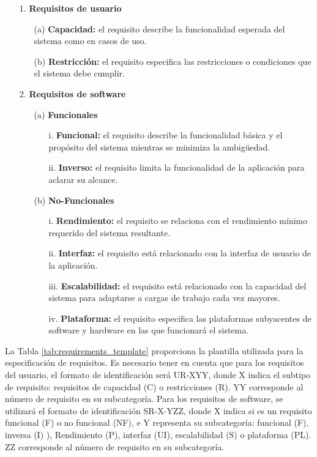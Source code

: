 \begin{itemize}
\item[1.] \textbf{Requisitos de usuario} 
	\begin{itemize}
		\item[(a)] \textbf{Capacidad:} el requisito describe la funcionalidad esperada del sistema como en casos de uso.
		\item[(b)] \textbf{Restricción:} el requisito especifica las restricciones o condiciones que el sistema debe cumplir.
	\end{itemize}	
\end{itemize}

\begin{itemize}
\item[2.] \textbf{Requisitos de \gls{software}}
	\begin{itemize}
	\item[(a)] 	\textbf{Funcionales}
		\begin{itemize}
		\item[i.] 	\textbf{Funcional:} el requisito describe la funcionalidad básica y el propósito del sistema mientras se minimiza la ambigüedad.
		\item[ii.] 	\textbf{Inverso:} el requisito limita la funcionalidad de la aplicación para aclarar su alcance.
		\end{itemize}

	\item[(b)] 	\textbf{No-Funcionales}
		\begin{itemize}
		\item[i.] 	\textbf{Rendimiento:} el requisito se relaciona con el rendimiento mínimo requerido del sistema resultante.
		\item[ii.] 	\textbf{Interfaz:} el requisito está relacionado con la interfaz de usuario de la aplicación.
		\item[iii.] 	\textbf{Escalabilidad:} el requisito está relacionado con la capacidad del sistema para adaptarse a cargas de trabajo cada vez mayores.
		\item[iv.] 	\textbf{Plataforma:} el requisito especifica las plataformas subyacentes de \gls{software} y \gls{hardware} en las que funcionará el sistema.
		\end{itemize}			
	\end{itemize}
\end{itemize}

La Tabla \ref{tab:requirements_template} proporciona la plantilla utilizada para la especificación de requisitos. Es necesario tener en cuenta que para los requisitos del usuario, el formato de identificación será UR-XYY, donde X indica el subtipo de requisito: requisitos de capacidad (C) o restricciones (R). YY corresponde al número de requisito en su subcategoría. Para los requisitos de \gls{software}, se utilizará el formato de identificación SR-X-YZZ, donde X indica si es un requisito funcional (F) o no funcional (NF), e Y representa su subcategoría: funcional (F), inversa (I) ), Rendimiento (P), interfaz (UI), escalabilidad (S) o plataforma (PL). ZZ corresponde al número de requisito en su subcategoría.

